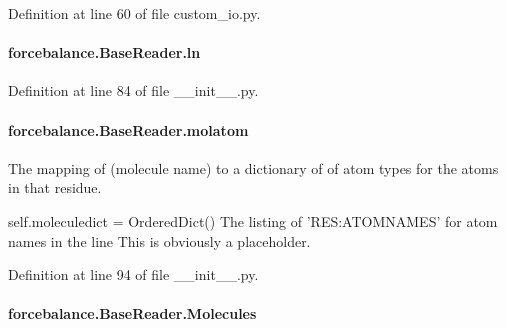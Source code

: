 Definition at line 60 of file custom\-\_\-io.\-py.

\hypertarget{classforcebalance_1_1BaseReader_a80c8e3bea212600742968aa8669e557b}{
\paragraph[{ln}]{\setlength{\rightskip}{0pt plus 5cm}forcebalance.\-Base\-Reader.\-ln\hspace{0.3cm}{\ttfamily [inherited]}}}\label{classforcebalance_1_1BaseReader_a80c8e3bea212600742968aa8669e557b}


Definition at line 84 of file \-\_\-\-\_\-init\-\_\-\-\_\-.\-py.

\hypertarget{classforcebalance_1_1BaseReader_ab444c213e15929253dd73395ac5f19fc}{
\paragraph[{molatom}]{\setlength{\rightskip}{0pt plus 5cm}forcebalance.\-Base\-Reader.\-molatom\hspace{0.3cm}{\ttfamily [inherited]}}}\label{classforcebalance_1_1BaseReader_ab444c213e15929253dd73395ac5f19fc}


The mapping of (molecule name) to a dictionary of of atom types for the atoms in that residue. 

self.\-moleculedict = Ordered\-Dict() The listing of 'R\-E\-S\-:A\-T\-O\-M\-N\-A\-M\-E\-S' for atom names in the line This is obviously a placeholder. 

Definition at line 94 of file \-\_\-\-\_\-init\-\_\-\-\_\-.\-py.

\hypertarget{classforcebalance_1_1BaseReader_a4369b5fb663a83b11602daa71db6862e}{
\paragraph[{Molecules}]{\setlength{\rightskip}{0pt plus 5cm}forcebalance.\-Base\-Reader.\-Molecules\hspace{0.3cm}{\ttfamily [inherited]}}}\label{classforcebalance_1_1BaseReader_a4369b5fb663a83b11602daa71db6862e}


